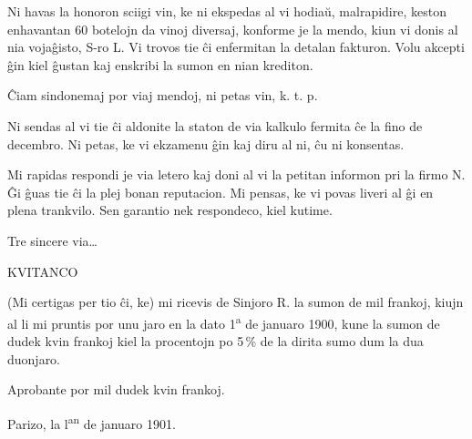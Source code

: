 
   Ni havas la honoron sciigi vin, ke ni ekspedas al vi hodia\u u,
malrapidire, keston enhavantan 60 botelojn da vinoj diversaj,
konforme je la mendo, kiun vi donis al nia voja\^gisto, S-ro L. Vi
trovos tie \^ci enfermitan la detalan fakturon. Volu akcepti \^gin
kiel \^gustan kaj enskribi la sumon en nian krediton.

   \^Ciam sindonemaj por viaj mendoj, ni petas vin, k. t. p.


   Ni sendas al vi tie \^ci aldonite la staton de via kalkulo fermita \^ce
la fino de decembro. Ni petas, ke vi ekzamenu \^gin kaj diru al ni,
\^cu ni konsentas.


   Mi rapidas respondi je via letero kaj doni al vi la petitan informon
pri la firmo N. \^Gi \^guas tie \^ci la plej bonan reputacion. Mi
pensas, ke vi povas liveri al \^gi en plena trankvilo. Sen garantio
nek respondeco, kiel kutime.

   Tre sincere via\dots

\begin{center}
 KVITANCO
\end{center}

   (Mi certigas per tio \^ci, ke) mi ricevis de Sinjoro R. la sumon
de mil frankoj, kiujn al li mi pruntis por unu jaro en la dato 1\textsuperscript{a} de
januaro 1900, kune la sumon de dudek kvin frankoj kiel la procentojn
po 5\,\% de la dirita sumo dum la dua duonjaro.

   Aprobante por mil dudek kvin frankoj.

   Parizo, la l\textsuperscript{an} de januaro 1901.


\smallrule{}
